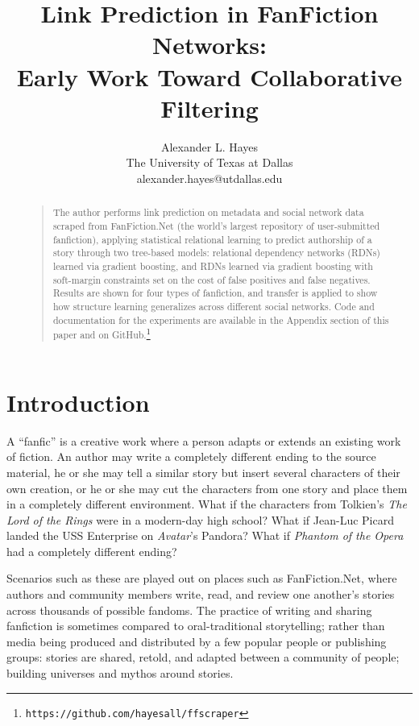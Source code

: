 \documentclass[letterpaper]{article}
\begin{document}
%

\title{Link Prediction in FanFiction Networks:\\Early Work Toward Collaborative Filtering}
\author{Alexander L. Hayes\\
The University of Texas at Dallas\\
alexander.hayes@utdallas.edu\\
}

\maketitle
\begin{abstract}
\begin{quote}
The author performs link prediction on metadata and social network data scraped from FanFiction.Net (the world's largest repository of user-submitted fanfiction), applying statistical relational learning to predict authorship of a story through two tree-based models: relational dependency networks (RDNs) learned via gradient boosting, and RDNs learned via gradient boosting with soft-margin constraints set on the cost of false positives and false negatives. Results are shown for four types of fanfiction, and transfer is applied to show how structure learning generalizes across different social networks. Code and documentation for the experiments are available in the Appendix section of this paper and on GitHub.\footnote{\texttt{https://github.com/hayesall/ffscraper}}
\end{quote}
\end{abstract}

\section{Introduction}
A ``fanfic'' is a creative work where a person adapts or extends an existing work of fiction.  An author may write a completely different ending to the source material, he or she may tell a similar story but insert several characters of their own creation, or he or she may cut the characters from one story and place them in a completely different environment.  What if the characters from Tolkien's \textit{The Lord of the Rings} were in a modern-day high school?  What if Jean-Luc Picard landed the USS Enterprise on \textit{Avatar}'s Pandora?  What if \textit{Phantom of the Opera} had a completely different ending?

Scenarios such as these are played out on places such as FanFiction.Net, where authors and community members write, read, and review one another's stories across thousands of possible fandoms.  The practice of writing and sharing fanfiction is sometimes compared to oral-traditional storytelling; rather than media being produced and distributed by a few popular people or publishing groups: stories are shared, retold, and adapted between a community of people; building universes and mythos around stories.
\end{document}
